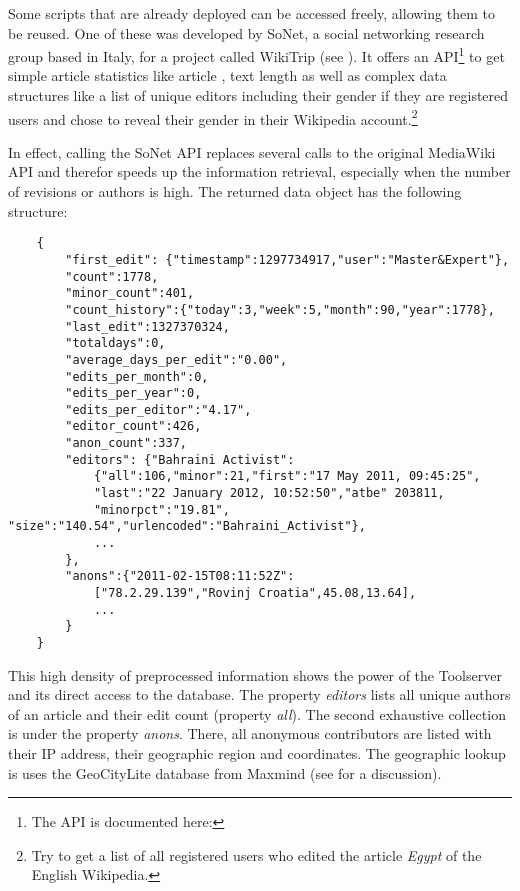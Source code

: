 Some scripts that are already deployed can be accessed freely, allowing them to be reused.
One of these was developed by SoNet, a social networking research group based in Italy, for a project called WikiTrip (see ).
It offers an \ac{API}\footnote{The \ac{API} is documented here: } to get simple article statistics like article , text length as well as complex data structures like a list of unique editors including their gender if they are registered users and chose to reveal their gender in their Wikipedia account.\footnote{Try  to get a list of all registered users who edited the article \emph{Egypt} of the English Wikipedia.}

In effect, calling the SoNet \ac{API} replaces several calls to the original MediaWiki \ac{API} and therefor speeds up the information retrieval, especially when the number of revisions or authors is high.
The returned data object has the following structure:

\begin{lstlisting}
	{
		"first_edit": {"timestamp":1297734917,"user":"Master&Expert"},
		"count":1778,
		"minor_count":401,
		"count_history":{"today":3,"week":5,"month":90,"year":1778},
		"last_edit":1327370324,
		"totaldays":0,
		"average_days_per_edit":"0.00",
		"edits_per_month":0,
		"edits_per_year":0,
		"edits_per_editor":"4.17",
		"editor_count":426,
		"anon_count":337,
		"editors": {"Bahraini Activist":
			{"all":106,"minor":21,"first":"17 May 2011, 09:45:25",
			"last":"22 January 2012, 10:52:50","atbe" 203811,
			"minorpct":"19.81", "size":"140.54","urlencoded":"Bahraini_Activist"},
			...
		},
		"anons":{"2011-02-15T08:11:52Z":
			["78.2.29.139","Rovinj Croatia",45.08,13.64],
			...
		}
	}
\end{lstlisting}

This high density of preprocessed information shows the power of the Toolserver and its direct access to the database.
The property \emph{editors} lists all unique authors of an article and their edit count (property \emph{all}).
The second exhaustive collection is under the property \emph{anons}. 
There, all anonymous contributors are listed with their \ac{IP} address, their geographic region and coordinates.
The geographic lookup is uses the GeoCityLite database from Maxmind (see  for a discussion).

